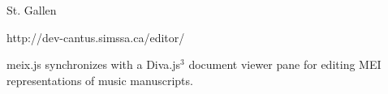 \documentclass[final]{beamer}
\newcommand{\blockSpace}{\vskip 0.75ex}
\begin{document}
\begin{frame}[fragile,t]
\begin{minipage}[t][.8\textheight]{\textwidth}
\begin{columns}
\begin{column}{0.95\textwidth}
\begin{block}{}
\begin{columns}
        \begin{column}{0.00cm}
        \end{column}

        \end{columns}
        \end{block}

        \vspace{2cm}
        \begin{block}{}
        \vspace{-3cm}
        \begin{columns}
        \begin{column}{0.47\textwidth}
            \vspace{-.5cm}
            \begin{block}{St. Gallen}
            \begin{center}
                \vspace{-0.75\baselineskip}
                \small{http://dev-cantus.simssa.ca/editor/}
                \normalsize
                \vspace{0.25\baselineskip}
            \end{center}
    
            meix.js synchronizes with a Diva.js$^3$ document viewer pane for editing MEI representations of music manuscripts.
                

\end{block}
\end{column}
\end{columns}
\end{block}
\end{column}
\end{columns}
\end{minipage}
\end{frame}
\end{document}
